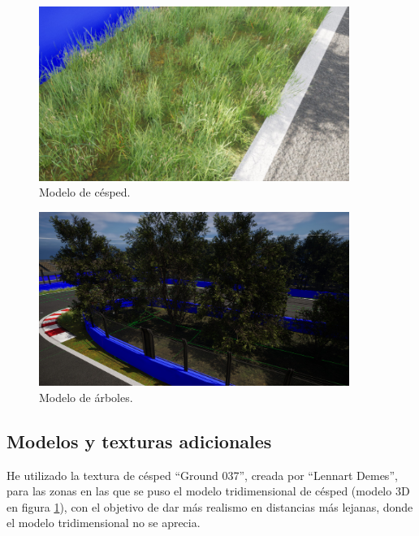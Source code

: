 \begin{figure}[H]
    \centering
    \includegraphics[width=0.9\textwidth]{imagenes/converted/cesped.jpg}
    \caption{Modelo de césped.}
    \label{fig:cesped}
\end{figure}

\begin{figure}[H]
    \centering
    \includegraphics[width=0.9\textwidth]{imagenes/converted/arboles.jpg}
    \caption{Modelo de árboles.}
    \label{fig:arboles}
\end{figure}

\subsection{Modelos y texturas adicionales}

He utilizado la textura de césped ``Ground 037''\cite{grasstexture}, creada por ``Lennart Demes'', para las zonas en las que se puso el modelo tridimensional de césped (modelo 3D en figura \ref{fig:cesped}), con el objetivo de dar más realismo en distancias más lejanas, donde el modelo tridimensional no se aprecia. 

\bigskip

